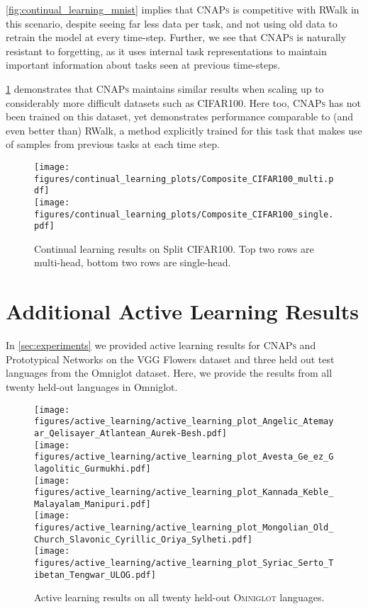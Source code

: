 \documentclass{article}
\theoremstyle{definition}
\newcommand{\cnaps}{\textsc{CNAPs}}
\begin{document}
\cref{fig:continual_learning_mnist} implies that \cnaps{} is competitive with RWalk in this scenario, despite seeing far less data per task, and not using old data to retrain the model at every time-step. Further, we see that \cnaps{} is naturally resistant to forgetting, as it uses internal task representations to maintain important information about tasks seen at previous time-steps.

\cref{fig:continual_learning_cifar100} demonstrates that \cnaps{} maintains similar results when scaling up to considerably more difficult datasets such as CIFAR100. Here too, \cnaps{} has not been trained on this dataset, yet demonstrates performance comparable to (and even better than) RWalk, a method explicitly trained for this task that makes use of samples from previous tasks at each time step. 

\begin{figure}[htb]
    \texttt{[image: figures/continual\_learning\_plots/Composite\_CIFAR100\_multi.pdf]} \\
    \texttt{[image: figures/continual\_learning\_plots/Composite\_CIFAR100\_single.pdf]} \\
    \caption{Continual learning results on Split CIFAR100. Top two rows are multi-head, bottom two rows are single-head.}
    \label{fig:continual_learning_cifar100}
\end{figure}


\clearpage
\newpage


\section{Additional Active Learning Results}
\label{app:additional_active_learning_results}

In \cref{sec:experiments} we provided active learning results for \cnaps{} and 
Prototypical Networks on the VGG Flowers dataset and three held out test languages from the Omniglot dataset. Here, we provide the results from all twenty held-out languages in Omniglot.

\begin{figure}[htb]
     \texttt{[image: figures/active\_learning/active\_learning\_plot\_Angelic\_Atemayar\_Qelisayer\_Atlantean\_Aurek-Besh.pdf]} \\
     \texttt{[image: figures/active\_learning/active\_learning\_plot\_Avesta\_Ge\_ez\_Glagolitic\_Gurmukhi.pdf]} \\
     \texttt{[image: figures/active\_learning/active\_learning\_plot\_Kannada\_Keble\_Malayalam\_Manipuri.pdf]} \\
     \texttt{[image: figures/active\_learning/active\_learning\_plot\_Mongolian\_Old\_Church\_Slavonic\_Cyrillic\_Oriya\_Sylheti.pdf]} \\
     \texttt{[image: figures/active\_learning/active\_learning\_plot\_Syriac\_Serto\_Tibetan\_Tengwar\_ULOG.pdf]} \\
     \caption{Active learning results on all twenty held-out \textsc{Omniglot} languages.}
     \label{fig:active_learning_complete}
\end{figure}
\end{document}
